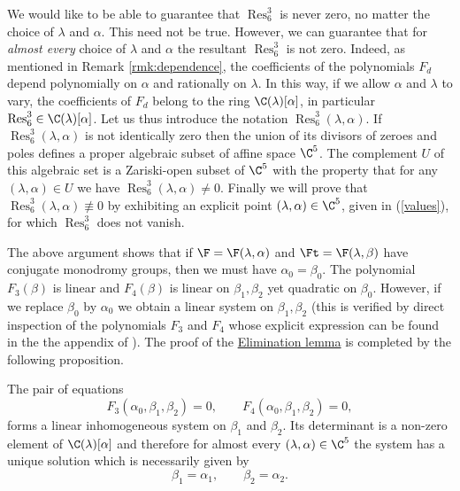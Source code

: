 We would like to be able to guarantee that $\operatorname{Res}^3_6$ is never zero, no matter the choice of $\lambda$ and $\alpha$. This need not be true. However, we can guarantee that for \emph{almost every} choice of $\lambda$ and $\alpha$ the resultant $\operatorname{Res}^3_6$ is not zero. Indeed, as mentioned in Remark \ref{rmk:dependence}, the coefficients of the polynomials $F_d$ depend polynomially on $\alpha$ and rationally on $\lambda$. In this way, if we allow $\alpha$ and $\lambda$ to vary, the coefficients of $F_d$ belong to the ring $\C(\lambda)[\alpha]$, in particular $\operatorname{Res}^3_6\in\C(\lambda)[\alpha]$. Let us thus introduce the notation $\operatorname{Res}^3_6(\lambda,\alpha)$. If $\operatorname{Res}^3_6(\lambda,\alpha)$ is not identically zero then the union of its divisors of zeroes and poles defines a proper algebraic subset of affine space $\C^5$. The complement $U$ of this algebraic set is a Zariski-open subset of $\C^5$ with the property that for any $(\lambda,\alpha)\in U$ we have $\operatorname{Res}^3_6(\lambda,\alpha)\neq 0$. Finally we will prove that $\operatorname{Res}^3_6(\lambda,\alpha)\not\equiv 0$ by exhibiting an explicit point $(\lambda,\alpha)\in\C^5$, given in (\ref{values}), for which $\operatorname{Res}^3_6$ does not vanish. 

The above argument shows that if $\F=\F(\lambda,\alpha)$ and $\Ft=\F(\lambda,\beta)$ have conjugate monodromy groups, then we must have $\alpha_0=\beta_0$. The polynomial $F_3(\beta)$ is linear and $F_4(\beta)$ is linear on $\beta_1,\beta_2$ yet quadratic on $\beta_0$. However, if we replace $\beta_0$ by $\alpha_0$ we obtain a linear system on $\beta_1,\beta_2$ (this is verified by direct inspection of the polynomials $F_3$ and $F_4$ whose explicit expression can be found in the the appendix of \cite{arXivVersion}). The proof of the \hyperref[lemma:elimination]{Elimination lemma} is completed by the following proposition.

\begin{proposition}\label{prop:elimination2}
The pair of equations
\begin{equation}\label{eq:elimination2}
F_3(\alpha_0,\beta_1,\beta_2)=0,\qquad F_4(\alpha_0,\beta_1,\beta_2)=0,
\end{equation}
forms a linear inhomogeneous system on $\beta_1$ and $\beta_2$. Its determinant is a non-zero element of $\C(\lambda)[\alpha]$ and therefore for almost every $(\lambda,\alpha)\in\C^5$ the system has a unique solution which is necessarily given by 
\[ \beta_1=\alpha_1, \qquad \beta_2=\alpha_2. \]
\end{proposition}

